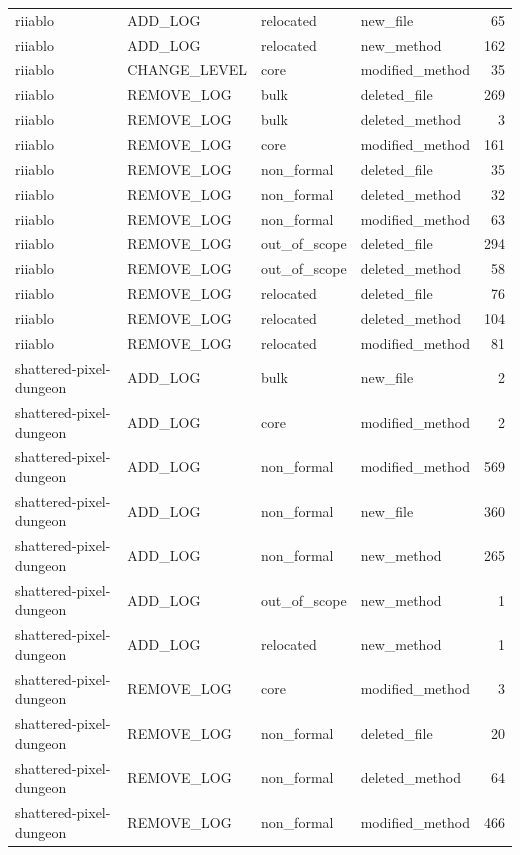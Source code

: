 {\begin{longtable}{llllr}
riiablo & ADD\_LOG & relocated & new\_file & 65 \\
riiablo & ADD\_LOG & relocated & new\_method & 162 \\
riiablo & CHANGE\_LEVEL & core & modified\_method & 35 \\
riiablo & REMOVE\_LOG & bulk & deleted\_file & 269 \\
riiablo & REMOVE\_LOG & bulk & deleted\_method & 3 \\
riiablo & REMOVE\_LOG & core & modified\_method & 161 \\
riiablo & REMOVE\_LOG & non\_formal & deleted\_file & 35 \\
riiablo & REMOVE\_LOG & non\_formal & deleted\_method & 32 \\
riiablo & REMOVE\_LOG & non\_formal & modified\_method & 63 \\
riiablo & REMOVE\_LOG & out\_of\_scope & deleted\_file & 294 \\
riiablo & REMOVE\_LOG & out\_of\_scope & deleted\_method & 58 \\
riiablo & REMOVE\_LOG & relocated & deleted\_file & 76 \\
riiablo & REMOVE\_LOG & relocated & deleted\_method & 104 \\
riiablo & REMOVE\_LOG & relocated & modified\_method & 81 \\
shattered-pixel-dungeon & ADD\_LOG & bulk & new\_file & 2 \\
shattered-pixel-dungeon & ADD\_LOG & core & modified\_method & 2 \\
shattered-pixel-dungeon & ADD\_LOG & non\_formal & modified\_method & 569 \\
shattered-pixel-dungeon & ADD\_LOG & non\_formal & new\_file & 360 \\
shattered-pixel-dungeon & ADD\_LOG & non\_formal & new\_method & 265 \\
shattered-pixel-dungeon & ADD\_LOG & out\_of\_scope & new\_method & 1 \\
shattered-pixel-dungeon & ADD\_LOG & relocated & new\_method & 1 \\
shattered-pixel-dungeon & REMOVE\_LOG & core & modified\_method & 3 \\
shattered-pixel-dungeon & REMOVE\_LOG & non\_formal & deleted\_file & 20 \\
shattered-pixel-dungeon & REMOVE\_LOG & non\_formal & deleted\_method & 64 \\
shattered-pixel-dungeon & REMOVE\_LOG & non\_formal & modified\_method & 466 \\

\end{longtable}}

